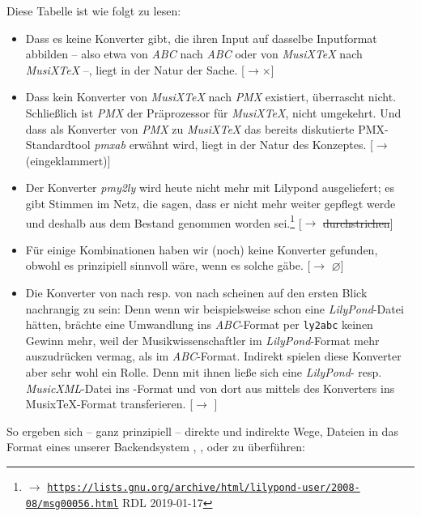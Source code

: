 Diese Tabelle ist wie folgt zu lesen:

\begin{itemize}
  \item Dass es keine Konverter gibt, die ihren Input auf dasselbe Inputformat
  abbilden -- also etwa von \textit{ABC} nach \textit{ABC} oder von
  \textit{MusiX\TeX} nach \textit{MusiX\-\TeX} --, liegt in der Natur der Sache.
  [$\rightarrow \times$]
  \item Dass kein Konverter von \textit{MusiX\TeX} nach \textit{PMX} existiert,
  überrascht nicht. Schließlich ist \textit{PMX} der Präprozessor für
  \textit{MusiX\TeX}, nicht umgekehrt. Und dass als Konverter von \textit{PMX}
  zu \textit{MusiX\TeX} das bereits diskutierte PMX-Standardtool \textit{pmxab}
  erwähnt wird, liegt in der Natur des Konzeptes. [$\rightarrow$
  (eingeklammert)]
  \item Der Konverter \textit{pmy2ly} wird heute nicht mehr mit Lilypond
  ausgeliefert; es gibt Stimmen im Netz, die sagen, dass er nicht mehr weiter
  gepflegt werde und deshalb aus dem Bestand genommen worden sei.\footnote{$\rightarrow$
  \href{https://lists.gnu.org/archive/html/lilypond-user/2008-08/msg00056.html}{
  \texttt{https://lists.gnu.org/archive/html/lilypond-user/2008-08/msg00056.html}}
  RDL 2019-01-17} [$\rightarrow$ \sout{durchstrichen}]



  \item Für einige Kombinationen haben wir (noch) keine Konverter gefunden,
  obwohl es prinzipiell sinnvoll wäre, wenn es solche gäbe. [$\rightarrow$
  $\varnothing$]  
  \item Die Konverter von  nach  resp. von 
  nach  scheinen auf den ersten Blick nachrangig zu sein: Denn wenn wir
  beispielsweise schon eine \textit{LilyPond}-Datei hätten, brächte eine
  Umwandlung ins \textit{ABC}-Format per \texttt{ly2abc} keinen Gewinn mehr,
  weil der Musikwissenschaftler im \textit{LilyPond}-Format mehr auszudrücken
  vermag, als im \textit{ABC}-Format. Indirekt spielen diese Konverter aber sehr
  wohl ein Rolle. Denn mit ihnen ließe sich eine \textit{LilyPond}- resp.
  \textit{MusicXML}-Datei ins -Format und von dort aus mittels des
  Konverters  ins Musix\TeX-Format transferieren.
  [$\rightarrow$ ]
\end{itemize}

So ergeben sich -- ganz prinzipiell -- direkte und indirekte Wege,
Dateien in das Format eines unserer Backendsystem , , 
 oder  zu überführen:

